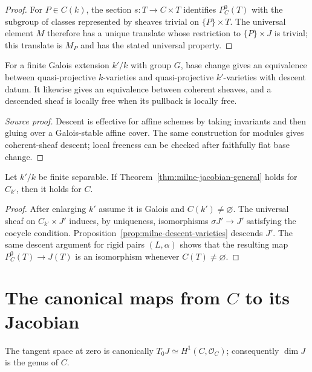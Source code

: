 \begin{proof}

For $P\in C(k)$, the section $s:T\to C\times T$ identifies $P_C^0(T)$ with the subgroup of classes represented by sheaves trivial on $\{P\}\times T$. The universal element $M$ therefore has a unique translate whose restriction to $\{P\}\times J$ is trivial; this translate is $M_P$ and has the stated universal property.

\end{proof}

\begin{proposition}\label{prop:milne-descent-varieties}
For a finite Galois extension $k'/k$ with group $G$, base change gives an equivalence between quasi-projective $k$-varieties and quasi-projective $k'$-varieties with descent datum. It likewise gives an equivalence between coherent sheaves, and a descended sheaf is locally free when its pullback is locally free.
\end{proposition}
\begin{proof}[Source proof]
Descent is effective for affine schemes by taking invariants and then gluing
over a Galois-stable affine cover.  The same construction for modules gives
coherent-sheaf descent; local freeness can be checked after faithfully flat
base change.
\end{proof}
\begin{proposition}\label{prop:milne-jacobian-descent}
Let $k'/k$ be finite separable. If Theorem~\ref{thm:milne-jacobian-general} holds for $C_{k'}$, then it holds for $C$.
\end{proposition}

\begin{proof}

After enlarging $k'$ assume it is Galois and $C(k')\ne\varnothing$. The universal sheaf on $C_{k'}\times J'$ induces, by uniqueness, isomorphisms $\sigma J'\to J'$ satisfying the cocycle condition. Proposition~\ref{prop:milne-descent-varieties} descends $J'$. The same descent argument for rigid pairs $(L,\alpha)$ shows that the resulting map $P_C^0(T)\to J(T)$ is an isomorphism whenever $C(T)\ne\varnothing$.

\end{proof}


\section{The canonical maps from $C$ to its Jacobian}
\begin{proposition}\label{prop:milne-jacobian-tangent}
The tangent space at zero is canonically $T_0J\simeq H^1(C,\mathcal O_C)$; consequently $\dim J$ is the genus of $C$.
\end{proposition}

